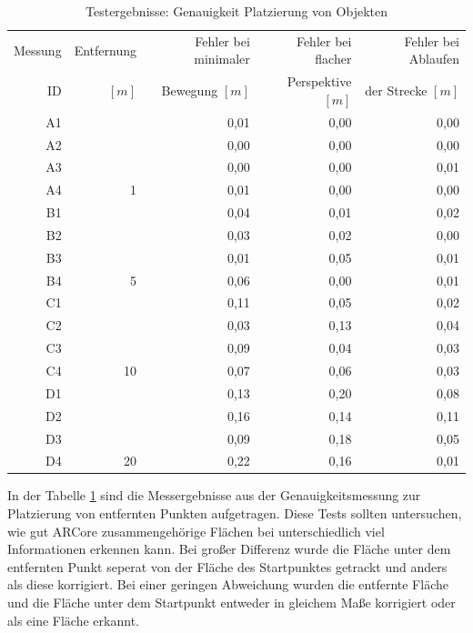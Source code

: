 \documentclass[10pt]{scrartcl}
\begin{document}
\begin{table}
\centering
\begin{tabular}{|r|r|r|r|r|}
\hline
Messung & Entfernung & Fehler bei minimaler & Fehler bei flacher & Fehler bei Ablaufen \\
ID & $[m]$ & Bewegung $[m]$ & Perspektive $[m]$ & der Strecke $[m]$ \\\hline

A1 & & 0,01 & 0,00 & 0,00 \\
A2 & & 0,00 & 0,00 & 0,00 \\
A3 & & 0,00 & 0,00 & 0,01 \\
A4 & 1 & 0,01 & 0,00 & 0,00 \\\hline

B1 & & 0,04 & 0,01 & 0,02 \\
B2 & & 0,03 & 0,02 & 0,00 \\
B3 & & 0,01 & 0,05 & 0,01 \\
B4 & 5 & 0,06 & 0,00 & 0,01 \\\hline

C1 & & 0,11 & 0,05 & 0,02 \\
C2 & & 0,03 & 0,13 & 0,04 \\
C3 & & 0,09 & 0,04 & 0,03 \\
C4 & 10 & 0,07 & 0,06 & 0,03 \\\hline

D1 & & 0,13 & 0,20 & 0,08 \\
D2 & & 0,16 & 0,14 & 0,11 \\
D3 & & 0,09 & 0,18 & 0,05 \\
D4 & 20 & 0,22 & 0,16 & 0,01 \\\hline

\end{tabular}
\caption{\label{tab:araccuracy1}Testergebnisse: Genauigkeit Platzierung von Objekten}
\end{table}

In der Tabelle \ref{tab:araccuracy1} sind die Messergebnisse aus der Genauigkeitsmessung zur Platzierung von entfernten Punkten aufgetragen. Diese Tests sollten untersuchen, wie gut ARCore zusammengehörige Flächen bei unterschiedlich viel Informationen erkennen kann. Bei großer Differenz wurde die Fläche unter dem entfernten Punkt seperat von der Fläche des Startpunktes getrackt und anders als diese korrigiert. Bei einer geringen Abweichung wurden die entfernte Fläche und die Fläche unter dem Startpunkt entweder in gleichem Maße korrigiert oder als eine Fläche erkannt.
\end{document}
